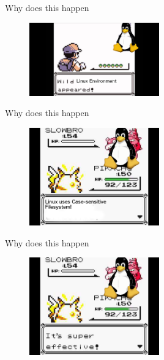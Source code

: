 \documentclass[pdf]{beamer}
\begin{document}

\begin{frame}{Why does this happen}
  \begin{figure}
    \centering
    \includegraphics[width = 0.5\textwidth]{images/appears}
  \end{figure}
\end{frame}



\begin{frame}{Why does this happen}
  \begin{figure}
    \centering
    \includegraphics[width = 0.5\textwidth]{images/uses}
  \end{figure}
\end{frame}



\begin{frame}{Why does this happen}
  \begin{figure}
    \centering
    \includegraphics[width = 0.5\textwidth]{images/supereffective}
  \end{figure}
\end{frame}
\end{document}
